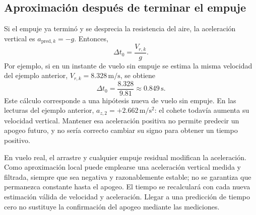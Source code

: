 \subsection{Aproximación después de terminar el empuje}
Si el empuje ya terminó y se desprecia la resistencia del aire, la aceleración vertical es $a_{\mathrm{pred},k}=-g$. Entonces,
\begin{equation}
 \boxed{\Delta t_0=\frac{V_{r,k}}{g}}.
\end{equation}
Por ejemplo, si en un instante de vuelo sin empuje se estima la misma velocidad del ejemplo anterior, $V_{r,k}=8.328\,\mathrm{m/s}$, se obtiene
\begin{equation}
 \Delta t_0=\frac{8.328}{9.81}\approx0.849\,\mathrm{s}.
\end{equation}
Este cálculo corresponde a una hipótesis nueva de vuelo sin empuje. En las lecturas del ejemplo anterior, $a_{z,2}=+2.662\,\mathrm{m/s^2}$: el cohete todavía aumenta su velocidad vertical. Mantener esa aceleración positiva no permite predecir un apogeo futuro, y no sería correcto cambiar su signo para obtener un tiempo positivo.

En vuelo real, el arrastre y cualquier empuje residual modifican la aceleración. Como aproximación local puede emplearse una aceleración vertical medida y filtrada, siempre que sea negativa y razonablemente estable; no se garantiza que permanezca constante hasta el apogeo. El tiempo se recalculará con cada nueva estimación válida de velocidad y aceleración. Llegar a una predicción de tiempo cero no sustituye la confirmación del apogeo mediante las mediciones.

